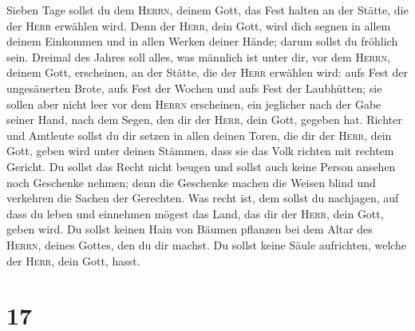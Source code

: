  Sieben Tage sollst du dem \textsc{Herrn}, deinem Gott,
das Fest halten an der Stätte, die der \textsc{Herr} erwählen wird. Denn
der \textsc{Herr}, dein Gott, wird dich segnen in allem deinem Einkommen
und in allen Werken deiner Hände; darum sollst du fröhlich sein.
 Dreimal des Jahres soll alles, was männlich ist unter
dir, vor dem \textsc{Herrn}, deinem Gott, erscheinen, an der Stätte, die
der \textsc{Herr} erwählen wird: aufs Fest der ungesäuerten Brote, aufs
Fest der Wochen und aufs Fest der Laubhütten; sie sollen aber nicht leer
vor dem \textsc{Herrn} erscheinen,  ein jeglicher nach
der Gabe seiner Hand, nach dem Segen, den dir der \textsc{Herr}, dein
Gott, gegeben hat.  Richter und Amtleute sollst du dir
setzen in allen deinen Toren, die dir der \textsc{Herr}, dein Gott,
geben wird unter deinen Stämmen, dass sie das Volk richten mit rechtem
Gericht.  Du sollst das Recht nicht beugen und sollst
auch keine Person ansehen noch Geschenke nehmen; denn die Geschenke
machen die Weisen blind und verkehren die Sachen der Gerechten.
 Was recht ist, dem sollst du nachjagen, auf dass du
leben und einnehmen mögest das Land, das dir der \textsc{Herr}, dein
Gott, geben wird.  Du sollst keinen Hain von Bäumen
pflanzen bei dem Altar des \textsc{Herrn}, deines Gottes, den du dir
machst.  Du sollst keine Säule aufrichten, welche der
\textsc{Herr}, dein Gott, hasst.

\hypertarget{section-16}{%
\section{17}\label{section-16}}

